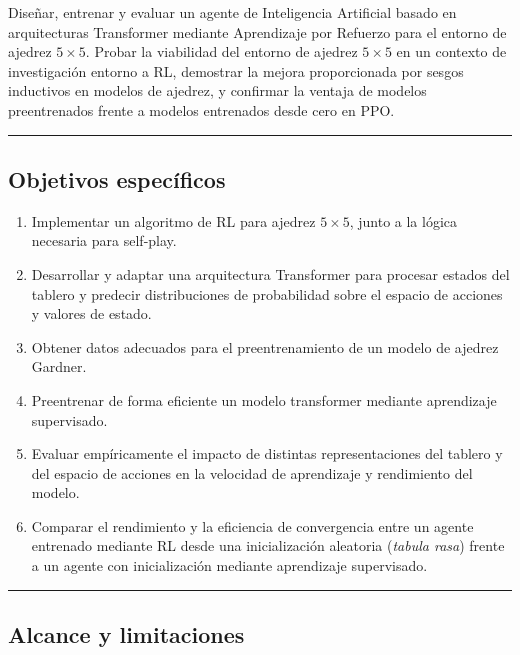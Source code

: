 \documentclass[12pt, a4paper]{article}
\begin{document}
Diseñar, entrenar y evaluar un agente de Inteligencia Artificial basado en arquitecturas Transformer mediante Aprendizaje por Refuerzo para el entorno de ajedrez $5\times5$. Probar la viabilidad del entorno de ajedrez $5\times5$ en un contexto de investigación entorno a RL, demostrar la mejora proporcionada por sesgos inductivos en modelos de ajedrez, y confirmar la ventaja de modelos preentrenados frente a modelos entrenados desde cero en PPO.

\rule{\textwidth}{0.2pt}

\subsection{Objetivos específicos}

\begin{enumerate}
    \item Implementar un algoritmo de RL para ajedrez $5\times5$, junto a la lógica necesaria para self-play.
    \item Desarrollar y adaptar una arquitectura Transformer para procesar estados del tablero y predecir distribuciones de probabilidad sobre el espacio de acciones y valores de estado.
    \item Obtener datos adecuados para el preentrenamiento de un modelo de ajedrez Gardner.
    \item Preentrenar de forma eficiente un modelo transformer mediante aprendizaje supervisado.
    \item Evaluar empíricamente el impacto de distintas representaciones del tablero y del espacio de acciones en la velocidad de aprendizaje y rendimiento del modelo.
    \item Comparar el rendimiento y la eficiencia de convergencia entre un agente entrenado mediante RL desde una inicialización aleatoria (\textit{tabula rasa}) frente a un agente con inicialización mediante aprendizaje supervisado.
\end{enumerate}

\rule{\textwidth}{0.2pt}

\subsection{Alcance y limitaciones}
\end{document}
